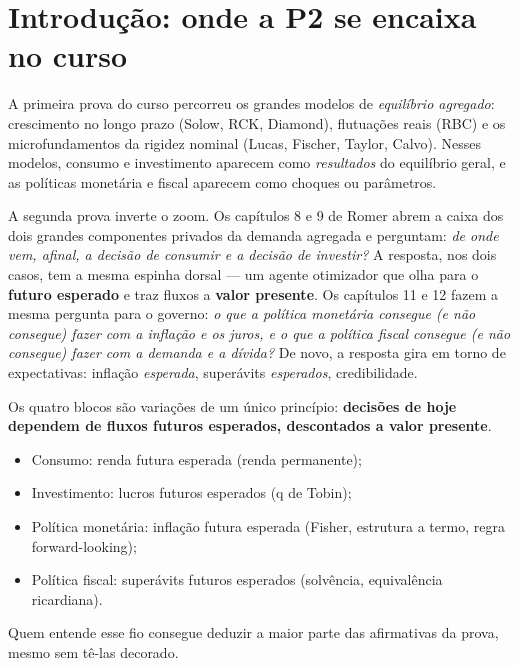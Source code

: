 \documentclass[12pt, a4paper]{article}
\begin{document}
\tableofcontents
\newpage

\section*{Introdução: onde a P2 se encaixa no curso}

A primeira prova do curso percorreu os grandes modelos de \emph{equilíbrio
agregado}: crescimento no longo prazo (Solow, RCK, Diamond), flutuações reais
(RBC) e os microfundamentos da rigidez nominal (Lucas, Fischer, Taylor,
Calvo). Nesses modelos, consumo e investimento aparecem como \emph{resultados}
do equilíbrio geral, e as políticas monetária e fiscal aparecem como choques
ou parâmetros.

A segunda prova inverte o zoom. Os capítulos 8 e 9 de Romer abrem a caixa dos
dois grandes componentes privados da demanda agregada e perguntam:
\emph{de onde vem, afinal, a decisão de consumir e a decisão de investir?} A
resposta, nos dois casos, tem a mesma espinha dorsal --- um agente otimizador
que olha para o \textbf{futuro esperado} e traz fluxos a \textbf{valor
presente}. Os capítulos 11 e 12 fazem a mesma pergunta para o governo:
\emph{o que a política monetária consegue (e não consegue) fazer com a
inflação e os juros, e o que a política fiscal consegue (e não consegue)
fazer com a demanda e a dívida?} De novo, a resposta gira em torno de
expectativas: inflação \emph{esperada}, superávits \emph{esperados},
credibilidade.

\begin{contextobox}[title={O fio condutor da P2}]
Os quatro blocos são variações de um único princípio: \textbf{decisões de
hoje dependem de fluxos futuros esperados, descontados a valor presente}.
\begin{itemize}[leftmargin=1.5em, itemsep=0.1em]
\item Consumo: renda futura esperada (renda permanente);
\item Investimento: lucros futuros esperados (q de Tobin);
\item Política monetária: inflação futura esperada (Fisher, estrutura a
termo, regra forward-looking);
\item Política fiscal: superávits futuros esperados (solvência, equivalência
ricardiana).
\end{itemize}
Quem entende esse fio consegue deduzir a maior parte das afirmativas da
prova, mesmo sem tê-las decorado.
\end{contextobox}
\end{document}
